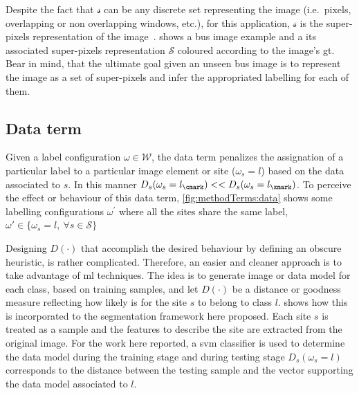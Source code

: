 Despite the fact that $\mathcal{s}$ can be any discrete set representing the image (i.e.\, pixels, overlapping or non overlapping windows, etc.), 
for this application, $\mathcal{s}$ is the super-pixels representation of the image~\cite{achanta2012slic}. 
 shows a \ac{bus} image example and a its associated super-pixels representation $\mathcal{S}$ coloured according to the image's \ac{gt}.
Bear in mind, that the ultimate goal given an unseen \ac{bus} image is to represent the image as a set of super-pixels and infer the appropriated labelling for each of them.

\subsection{Data term} \label{sec:method:dataTerm}

Given a label configuration $\omega \in \mathcal{W}$, the data term penalizes the assignation of a particular label to a particular image element or site ($\omega_s = l$) based on the data associated to $s$. 
In this manner $D_s(\omega_s=l_\cmark) << D_s(\omega_s=l_\xmark)$. 
To perceive the effect or behaviour of this data term, \cref{fig:methodTerms:data} shows some labelling configurations $\omega^'$ where all the sites share the same label, $\omega' \in \{ \omega_s=l,~\forall s\in\mathcal{S}\}$

Designing $D(\cdot)$ that accomplish the desired behaviour by defining an obscure heuristic, is rather complicated. 
Therefore, an easier and cleaner approach is to take advantage of \ac{ml} techniques. 
The idea is to generate image or data model for each class, based on training samples, and let $D(\cdot)$ be a distance or goodness measure reflecting how likely is for the site $s$ to belong to class $l$.
 shows how this is incorporated to the segmentation framework here proposed.
Each site $s$ is treated as a sample and the features to describe the site are extracted from the original image. 
For the work here reported, a \ac{svm} classifier is used to determine the data model during the training stage and during testing stage $D_s(\omega_s=l)$ corresponds to the distance between the testing sample and the vector supporting the data model associated to $l$. 

